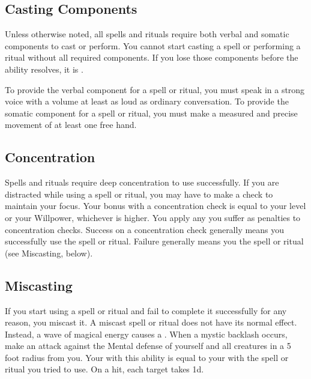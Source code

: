     \subsection{Casting Components}\label{Casting Components}
        Unless otherwise noted, all spells and rituals require both verbal and somatic components to cast or perform.
        You cannot start casting a spell or performing a ritual without all required components.
        If you lose those components before the ability resolves, it is .

        To provide the verbal component for a spell or ritual, you must speak in a strong voice with a volume at least as loud as ordinary conversation.
        To provide the somatic component for a spell or ritual, you must make a measured and precise movement of at least one free hand.

    \subsection{Concentration}\label{Concentration}
        Spells and rituals require deep concentration to use successfully.
        If you are distracted while using a spell or ritual, you may have to make a  check to maintain your focus.
        Your bonus with a concentration check is equal to your level or your Willpower, whichever is higher.
        You apply any  you suffer as penalties to concentration checks.
        Success on a concentration check generally means you successfully use the spell or ritual.
        Failure generally means you  the spell or ritual (see Miscasting, below).

    \subsection{Miscasting}\label{Miscasting}

        If you start using a spell or ritual and fail to complete it successfully for any reason, you miscast it.
        A miscast spell or ritual does not have its normal effect.
        Instead, a wave of magical energy causes a .
        When a mystic backlash occurs, make an attack against the Mental defense of yourself and all creatures in a 5 foot radius from you.
        Your  with this ability is equal to your  with the spell or ritual you tried to use.
        On a hit, each target takes  \minus1d.

